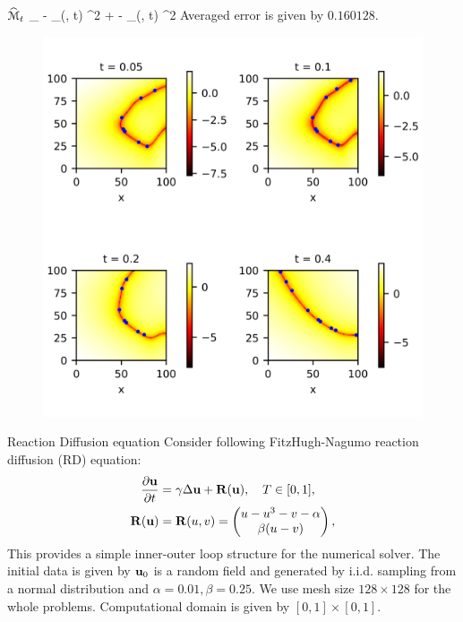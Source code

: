 \documentclass{beamer}
\begin{document}
\begin{frame}{$\widehat {\mathcal{M}}_t $}
	\bequn
		\min_{\theta} \mbE \norml \mfu - \phi_{\theta}(\mfx, t) \normr^2 + \lambda
		 \norml \wht \mfu - \phi_{\theta}(\wht \mfx, t) \normr^2
	\eequn
	Averaged error is given by $0.160128$.
	\begin{figure}[H]
          \centering
          \centerline{\includegraphics[width=0.65\linewidth]{fig/control4.jpg}}
          \label{l2-mfd}
	\end{figure}
\end{frame}


\begin{frame}{Reaction Diffusion equation}
	Consider following FitzHugh-Nagumo reaction diffusion (RD) equation:
	\begin{equation}\label{FN}
    \begin{aligned}
        	\frac{\partial \mathbf{u}}{\partial t} & = \gamma \Delta \mathbf{u} + \mathbf{R}(\mathbf{u}), \quad T \in [0, 1], 	\\
		\mathbf{R}(\mathbf{u}) & = \mathbf{R}(u, v) = \begin{pmatrix}
			u - u^3 - v - \alpha	\\
			\beta(u - v)
		\end{pmatrix},
    \end{aligned}
	\end{equation}
	This provides a simple inner-outer loop structure for the numerical solver.
	 The initial data is given by $\mathbf{u}_0$ is a random field and generated by i.i.d.
	  sampling from a normal distribution and $\alpha = 0.01, \beta=0.25$. We use
		 mesh size $128 \times 128$ for the whole problems. Computational domain is
		  given by $[0, 1]\times[0, 1]$.
\end{frame}
\end{document}

